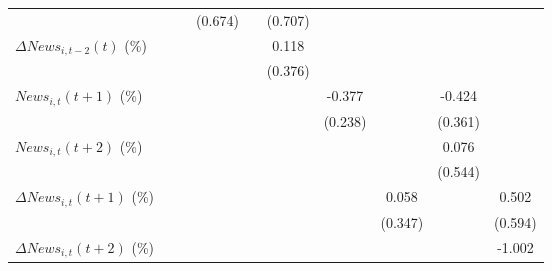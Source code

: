{\begin{tabular}{l*{9}{c}}
                    &                     &                     &     (0.674)         &                     &     (0.707)         &                     &                     &                     &                     \\
\addlinespace
$ \Delta News_{i,t-2}(t)$ (\%)&                     &                     &                     &                     &       0.118         &                     &                     &                     &                     \\
                    &                     &                     &                     &                     &     (0.376)         &                     &                     &                     &                     \\
\addlinespace
$ News_{i,t}(t+1)$ (\%)&                     &                     &                     &                     &                     &      -0.377         &                     &      -0.424         &                     \\
                    &                     &                     &                     &                     &                     &     (0.238)         &                     &     (0.361)         &                     \\
\addlinespace
$ News_{i,t}(t+2)$ (\%)&                     &                     &                     &                     &                     &                     &                     &       0.076         &                     \\
                    &                     &                     &                     &                     &                     &                     &                     &     (0.544)         &                     \\
\addlinespace
$ \Delta News_{i,t}(t+1)$ (\%)&                     &                     &                     &                     &                     &                     &       0.058         &                     &       0.502         \\
                    &                     &                     &                     &                     &                     &                     &     (0.347)         &                     &     (0.594)         \\
\addlinespace
$ \Delta News_{i,t}(t+2)$ (\%)&                     &                     &                     &                     &                     &                     &                     &                     &      -1.002         \\

\end{tabular}}
